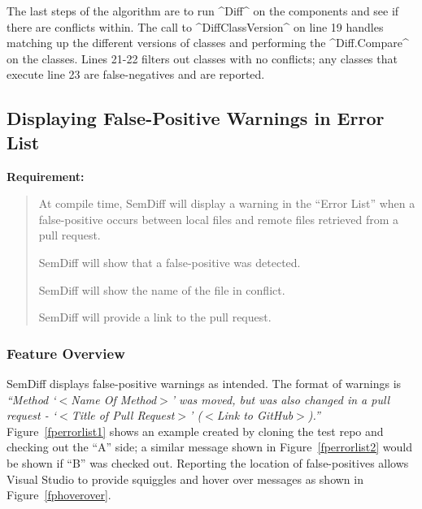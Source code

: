 \documentclass[draftclsnofoot,onecolumn]{IEEEtran}
\begin{document}
The last steps of the algorithm are to run ^Diff^ on the components and see if there are conflicts within. The call to ^DiffClassVersion^ on line 19 handles matching up the different versions of classes and performing the ^Diff.Compare^ on the classes. Lines 21-22 filters out classes with no conflicts; any classes that execute line 23 are false-negatives and are reported.

\subsection{Displaying False-Positive Warnings in Error List}%

\textbf{Requirement:}

\begin{quote}

At compile time, SemDiff will display a warning in the ``Error List'' when a false-positive occurs between local files and remote files retrieved from a pull request.

SemDiff will show that a false-positive was detected.

SemDiff will show the name of the file in conflict.

SemDiff will provide a link to the pull request.

\end{quote}

\subsubsection{Feature Overview}
SemDiff displays false-positive warnings as intended. The format of warnings is \textit{``Method `$<$Name Of Method$>$' was moved, but was also changed in a pull request - `$<$Title of Pull Request$>$' ($<$Link to GitHub$>$).''} Figure~\ref{fperrorlist1} shows an example created by cloning the test repo and checking out the ``A'' side; a similar message shown in Figure~\ref{fperrorlist2} would be shown if ``B'' was checked out. Reporting the location of false-positives allows Visual Studio to provide squiggles and hover over messages as shown in Figure~\ref{fphoverover}.
\end{document}
